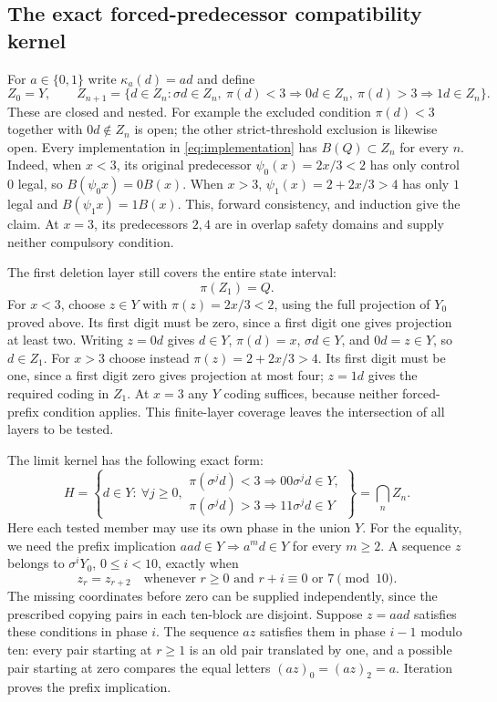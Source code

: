 \documentclass[11pt,reqno]{amsart}
\numberwithin{equation}{section}
\theoremstyle{definition}
\begin{document}
\subsection{The exact forced-predecessor compatibility kernel}
For $a\in\{0,1\}$ write $\kappa_a(d)=ad$ and define
\[
 Z_0=Y,\qquad Z_{n+1}=\{d\in Z_n:\sigma d\in Z_n,
 \ \pi(d)<3\Rightarrow0d\in Z_n,
 \ \pi(d)>3\Rightarrow1d\in Z_n\}.
\]
These are closed and nested. For example the excluded condition
$\pi(d)<3$ together with $0d\notin Z_n$ is open; the other
strict-threshold exclusion is likewise open.
Every implementation in \eqref{eq:implementation} has
$B(Q)\subset Z_n$ for every $n$. Indeed, when $x<3$,
its original predecessor $\psi_0(x)=2x/3<2$ has only control
$0$ legal, so $B(\psi_0x)=0B(x)$. When $x>3$,
$\psi_1(x)=2+2x/3>4$ has only $1$ legal and
$B(\psi_1x)=1B(x)$. This, forward consistency, and induction
give the claim. At $x=3$, its predecessors $2,4$ are in
overlap safety domains and supply neither compulsory condition.


The first deletion layer still covers the entire state interval:
\[
 \pi(Z_1)=Q.
\]
For $x<3$, choose $z\in Y$ with $\pi(z)=2x/3<2$, using the
full projection of $Y_0$ proved above. Its first digit must be
zero, since a first digit one gives projection at least two.
Writing $z=0d$ gives $d\in Y$, $\pi(d)=x$, $\sigma d\in Y$,
and $0d=z\in Y$, so $d\in Z_1$. For $x>3$ choose instead
$\pi(z)=2+2x/3>4$. Its first digit must be one, since a first
digit zero gives projection at most four; $z=1d$ gives the
required coding in $Z_1$. At $x=3$ any $Y$ coding suffices,
because neither forced-prefix condition applies. This finite-layer
coverage leaves the intersection of all layers to be tested.


The limit kernel has the following exact form:
\begin{equation}\label{eq:kernel-H}
 H=\left\{d\in Y:\ \forall j\ge0,
 \begin{array}{l}
 \pi(\sigma^jd)<3\Rightarrow00\sigma^jd\in Y,\\
 \pi(\sigma^jd)>3\Rightarrow11\sigma^jd\in Y
 \end{array}\right\}=\bigcap_nZ_n.
\end{equation}
Here each tested member may use its own phase in the union $Y$.
For the equality, we need the prefix implication
$aa d\in Y\Rightarrow a^m d\in Y$ for every $m\ge2$.
A sequence $z$ belongs to $\sigma^iY_0$, $0\le i<10$, exactly when
\[
 z_r=z_{r+2}\quad\text{whenever }r\ge0
       \text{ and }r+i\equiv0\text{ or }7\pmod {10}.
\]
The missing coordinates before zero can be supplied independently,
since the prescribed copying pairs in each ten-block are disjoint.
Suppose $z=aa d$ satisfies these conditions in phase $i$.
The sequence $az$ satisfies them in phase $i-1$ modulo ten:
every pair starting at $r\ge1$ is an old pair translated by one,
and a possible pair starting at zero compares the equal letters
$(az)_0=(az)_2=a$. Iteration proves the prefix implication.
\end{document}
